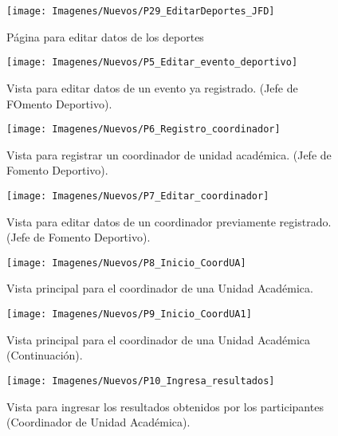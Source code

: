		\begin{figure} [hbt!]
			\centering
			\texttt{[image: Imagenes/Nuevos/P29\_EditarDeportes\_JFD]}
			\caption{Página para editar datos de los deportes}
			\label{editardeporte}
		\end{figure}
		\pagebreak
		
		\begin{figure} [hbt!]
			\centering
			\texttt{[image: Imagenes/Nuevos/P5\_Editar\_evento\_deportivo]}
			\caption{Vista para editar datos de un evento ya registrado. (Jefe de FOmento Deportivo).}
			\label{editarevento}
		\end{figure}
	
		\begin{figure} [hbt!]
			\centering
			\texttt{[image: Imagenes/Nuevos/P6\_Registro\_coordinador]}
			\caption{Vista para registrar un coordinador de unidad académica. (Jefe de Fomento Deportivo).}
			\label{registrarcoord}
		\end{figure}
		
		\begin{figure} [hbt!]
			\centering
			\texttt{[image: Imagenes/Nuevos/P7\_Editar\_coordinador]}
			\caption{Vista para editar datos de un coordinador previamente registrado. (Jefe de Fomento Deportivo).}
			\label{editarcoord}
		\end{figure}
\pagebreak

		\begin{figure} [hbt!]
			\centering
			\texttt{[image: Imagenes/Nuevos/P8\_Inicio\_CoordUA]}
			\caption{Vista principal para el coordinador de una Unidad Académica.}
			\label{principalcoord}
		\end{figure}
	
		\begin{figure} [hbt!]
			\centering
			\texttt{[image: Imagenes/Nuevos/P9\_Inicio\_CoordUA1]}
			\caption{Vista principal para el coordinador de una Unidad Académica (Continuación).}
			\label{principalcoord1}
		\end{figure}
	\pagebreak
		
		\begin{figure} [hbt!] 
			\centering
			\texttt{[image: Imagenes/Nuevos/P10\_Ingresa\_resultados]}
			\caption{Vista para ingresar los resultados obtenidos por los participantes (Coordinador de Unidad Académica).}
			\label{ingresaresultados}
		\end{figure}
		
